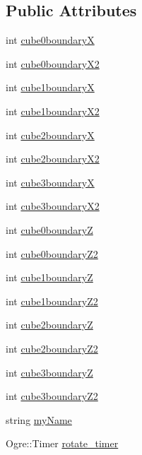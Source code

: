 \subsection*{Public Attributes}
\begin{DoxyCompactItemize}
\item 
int \hyperlink{classz_shape_ab573e49ed92efb74eea99eeb6015a8f0}{cube0boundary\-X}
\item 
int \hyperlink{classz_shape_a40fae2a3019c20406dc8dbbc9613becf}{cube0boundary\-X2}
\item 
int \hyperlink{classz_shape_a86d5935ac17eb4014518b32a0b7d0b20}{cube1boundary\-X}
\item 
int \hyperlink{classz_shape_a5195d555defef38a13c147cde4610124}{cube1boundary\-X2}
\item 
int \hyperlink{classz_shape_aadc304ad5e51018cd0217bc6f0a39165}{cube2boundary\-X}
\item 
int \hyperlink{classz_shape_a803a7236cf186faa5ea0ee7c86639ba7}{cube2boundary\-X2}
\item 
int \hyperlink{classz_shape_aeb96887365de974440f8494c9da2b097}{cube3boundary\-X}
\item 
int \hyperlink{classz_shape_ab3e6d24301edea1a2d7d35ca34d5b6ad}{cube3boundary\-X2}
\item 
int \hyperlink{classz_shape_a1137620e91f77e816ef97e4e2667499b}{cube0boundary\-Z}
\item 
int \hyperlink{classz_shape_a2d03d0e4d7a150d8d0f5370a4514262f}{cube0boundary\-Z2}
\item 
int \hyperlink{classz_shape_ab1ef86f5f194e4d9cd51488b33ed6642}{cube1boundary\-Z}
\item 
int \hyperlink{classz_shape_aec2d4ff13d10eae9c3b8bca21cbe53a6}{cube1boundary\-Z2}
\item 
int \hyperlink{classz_shape_a6e834a60e1cdeef415deae7f9d1af42d}{cube2boundary\-Z}
\item 
int \hyperlink{classz_shape_a125d6ca0a1894e10414668fd7d24a74b}{cube2boundary\-Z2}
\item 
int \hyperlink{classz_shape_ace4bd139f834c009fc28e38d8712cd65}{cube3boundary\-Z}
\item 
int \hyperlink{classz_shape_afdf3c0ed9499a640373394223bcf5c3e}{cube3boundary\-Z2}
\item 
string \hyperlink{classz_shape_a751cf070b6e1b1ee3936020f01beeab3}{my\-Name}
\item 
Ogre\-::\-Timer \hyperlink{classz_shape_ac8cc62dd7693b1b06d49b837b9a95b6e}{rotate\-\_\-timer}
\item 

\end{DoxyCompactItemize}
